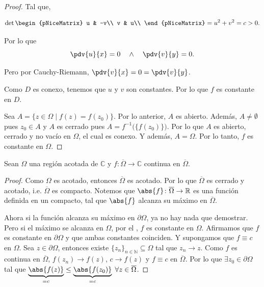\documentclass[../main.tex]{subfiles}
\begin{document}
\begin{proof}
    Tal que,

    \begin{equation*}
        \det
        \begin{pNiceMatrix}
            u & -v\\
            v & u\\
        \end{pNiceMatrix}
        = u^{2} + v^{2} = c > 0.
    \end{equation*}

    Por lo que
    \begin{equation*}
        \pdv{u}{x} = 0\quad \wedge \quad \pdv{v}{y} = 0.
    \end{equation*}

    Pero por Cauchy-Riemann, \(\pdv{v}{x} = 0 = \pdv{v}{y}\).

    Como \(D\) es conexo, tenemos que \(u\) y \(v\) son constantes. Por lo que \(f\) es
    constante en \(D\).

    Sea \(A = \bigl\lbrace z\in \Omega \mid f(z) = f(z_{0}) \bigr\rbrace\).
    Por lo anterior,
    \(A\) es abierto. Además, \(A \neq \emptyset\) pues \(z_{0}\in  A\) y
    \(A\) es cerrado
    pues \(A = f^{-1}\bigl(\{f(z_{0})\}\bigr)\). Por lo que \(A\) es abierto,
    cerrado y no
    vacío en \(\Omega\), el cual es conexo. Y además, \(A = \Omega\). Por lo
    tanto, \(f\) es
    constante en \(\Omega\).
\end{proof}


\begin{corollary}
    Sean \(\Omega\) una región acotada de \(\mathbb{C}\) y \(f \colon \overline{\Omega}
    \to \mathbb{C}\) continua en \(\overline{\Omega}\).
\end{corollary}

\begin{proof}
    Como \(\Omega\) es acotado, entonces \(\overline{\Omega}\) es acotado. Por lo que
    \(\overline{\Omega}\) es cerrado y acotado, i.e. \(\overline{\Omega}\) es compacto.
    Notemos que \(\abs{f} \colon \overline{\Omega} \to  \mathbb{R}\) es una función
    definida en un compacto, tal que \(\abs{f}\) alcanza su máximo en
    \(\overline{\Omega}\).

    Ahora si la función alcanza su máximo en \(\partial \Omega\), ya no hay nada que
    demostrar. Pero si el máximo se alcanza en \(\Omega\), por el
    ,
    \(f\) es constante en \(\Omega\). Afirmamos que \(f\) es constante en
    \(\partial\Omega\)
    y que ambas constantes coinciden. Y supongamos que \(f \equiv c\) en \(\Omega\). Sea
    \(z\in \partial\Omega\), entonces existe \(\bigl\lbrace z_{n} \bigr\rbrace_{n\in
    \mathbb{N}} \subseteq \Omega\) tal que \(z_{n} \to z\). Como \(f\) es continua en
    \(\overline{\Omega}\), \(f(z_{n}) \to f(z)\), \(c \to f(z)\) y \(f \equiv c\) en
    \(\overline{\Omega}\). Por lo que \(\exists z_{0}\in \partial\Omega\) tal que
    \(\underbrace{\abs{f(z)}}_{= c} \leq \underbrace{\abs{f(z_{0})}}_{= c}\;
        \forall z\in
    \overline{\Omega}\).
\end{proof}
\end{document}
